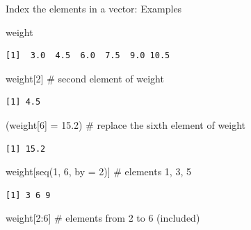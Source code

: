 \documentclass[
  ignorenonframetext,
]{beamer}
\newenvironment{Shaded}{\begin{snugshade}}{\end{snugshade}}
\newcommand{\AttributeTok}[1]{\textcolor[rgb]{0.00,0.34,0.68}{#1}}
\newcommand{\CommentTok}[1]{\textcolor[rgb]{0.54,0.53,0.53}{#1}}
\newcommand{\DecValTok}[1]{\textcolor[rgb]{0.69,0.50,0.00}{#1}}
\newcommand{\FloatTok}[1]{\textcolor[rgb]{0.69,0.50,0.00}{#1}}
\newcommand{\FunctionTok}[1]{\textcolor[rgb]{0.39,0.29,0.61}{#1}}
\newcommand{\NormalTok}[1]{\textcolor[rgb]{0.12,0.11,0.11}{#1}}
\newcommand{\OtherTok}[1]{\textcolor[rgb]{0.00,0.43,0.16}{#1}}
\newcommand{\SpecialCharTok}[1]{\textcolor[rgb]{0.24,0.68,0.91}{#1}}
\begin{document}
\begin{frame}[fragile]{Index the elements in a vector: Examples}
\protect\hypertarget{index-the-elements-in-a-vector-examples}{}
\centering

\begin{Shaded}
\begin{Highlighting}[]
\NormalTok{weight}
\end{Highlighting}
\end{Shaded}

\begin{verbatim}
[1]  3.0  4.5  6.0  7.5  9.0 10.5
\end{verbatim}

\footnotesize

\begin{Shaded}
\begin{Highlighting}[]
\NormalTok{weight[}\DecValTok{2}\NormalTok{]        }\CommentTok{\# second element of weight}
\end{Highlighting}
\end{Shaded}

\begin{verbatim}
[1] 4.5
\end{verbatim}

\begin{Shaded}
\begin{Highlighting}[]
\NormalTok{(weight[}\DecValTok{6}\NormalTok{] }\OtherTok{=} \FloatTok{15.2}\NormalTok{) }\CommentTok{\# replace the sixth element of weight}
\end{Highlighting}
\end{Shaded}

\begin{verbatim}
[1] 15.2
\end{verbatim}

\begin{Shaded}
\begin{Highlighting}[]
\NormalTok{weight[}\FunctionTok{seq}\NormalTok{(}\DecValTok{1}\NormalTok{, }\DecValTok{6}\NormalTok{, }\AttributeTok{by =} \DecValTok{2}\NormalTok{)] }\CommentTok{\# elements 1, 3, 5}
\end{Highlighting}
\end{Shaded}

\begin{verbatim}
[1] 3 6 9
\end{verbatim}

\begin{Shaded}
\begin{Highlighting}[]
\NormalTok{weight[}\DecValTok{2}\SpecialCharTok{:}\DecValTok{6}\NormalTok{]      }\CommentTok{\# elements from 2 to 6 (included)}
\end{Highlighting}
\end{Shaded}


\end{frame}
\end{document}
